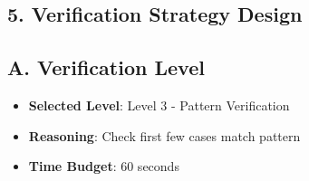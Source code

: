 \documentclass[11pt]{article}
\begin{document}
\begin{verificationbox}
\section*{5. Verification Strategy Design}

\subsection*{A. Verification Level}
\begin{itemize}[leftmargin=*]
    \item \textbf{Selected Level}: Level 3 - Pattern Verification
    \item \textbf{Reasoning}: Check first few cases match pattern
    \item \textbf{Time Budget}: 60 seconds
\end{itemize}


\end{verificationbox}
\end{document}
